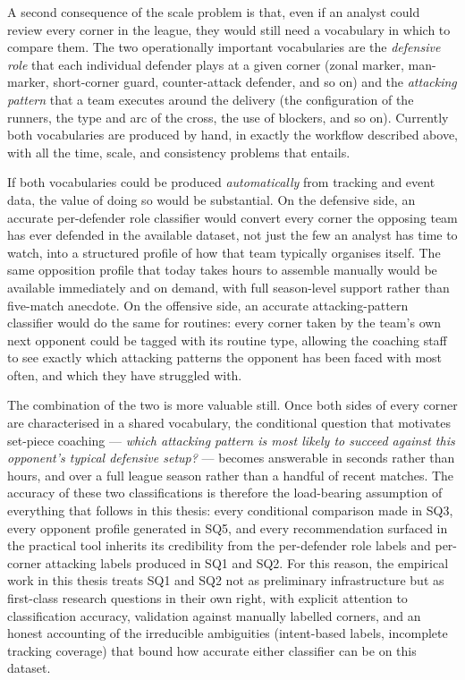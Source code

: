 A second consequence of the scale problem is that, even if an analyst could
review every corner in the league, they would still need a vocabulary in which
to compare them. The two operationally important vocabularies are the
\emph{defensive role} that each individual defender plays at a given corner
(zonal marker, man-marker, short-corner guard, counter-attack defender, and so
on) and the \emph{attacking pattern} that a team executes around the delivery
(the configuration of the runners, the type and arc of the cross, the use of
blockers, and so on). Currently both vocabularies are produced by hand, in
exactly the workflow described above, with all the time, scale, and consistency
problems that entails.

If both vocabularies could be produced \emph{automatically} from tracking and
event data, the value of doing so would be substantial. On the defensive side,
an accurate per-defender role classifier would convert every corner the
opposing team has ever defended in the available dataset, not just the few an
analyst has time to watch, into a structured profile of how that team
typically organises itself. The same opposition profile that today takes hours
to assemble manually would be available immediately and on demand, with full
season-level support rather than five-match anecdote. On the offensive side, an
accurate attacking-pattern classifier would do the same for routines: every
corner taken by the team's own next opponent could be tagged with its routine
type, allowing the coaching staff to see exactly which attacking patterns the
opponent has been faced with most often, and which they have struggled with.

The combination of the two is more valuable still. Once both sides of every
corner are characterised in a shared vocabulary, the conditional question that
motivates set-piece coaching --- \emph{which attacking pattern is most likely
to succeed against this opponent's typical defensive setup?} --- becomes
answerable in seconds rather than hours, and over a full league season rather
than a handful of recent matches. The accuracy of these two classifications is
therefore the load-bearing assumption of everything that follows in this
thesis: every conditional comparison made in SQ3, every opponent profile
generated in SQ5, and every recommendation surfaced in the practical tool
inherits its credibility from the per-defender role labels and per-corner
attacking labels produced in SQ1 and SQ2. For this reason, the empirical work
in this thesis treats SQ1 and SQ2 not as preliminary infrastructure but as
first-class research questions in their own right, with explicit attention to
classification accuracy, validation against manually labelled corners, and an
honest accounting of the irreducible ambiguities (intent-based labels,
incomplete tracking coverage) that bound how accurate either classifier can
be on this dataset.


